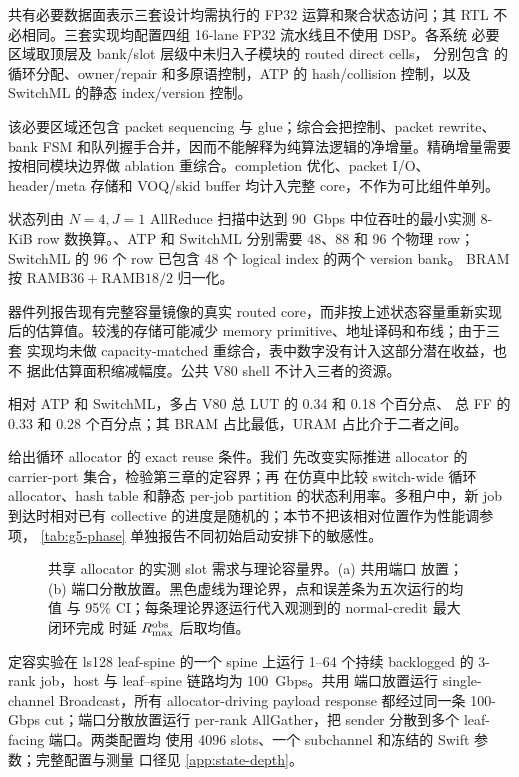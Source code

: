 共有必要数据面表示三套设计均需执行的 FP32 运算和聚合状态访问；其 RTL
不必相同。三套实现均配置四组 16-lane FP32 流水线且不使用 DSP。各系统
必要区域取顶层及 bank/slot 层级中未归入子模块的 routed direct cells，
分别包含 \sysname 的循环分配、owner/repair 和多原语控制，ATP 的
hash/collision 控制，以及 SwitchML 的静态 index/version 控制。

该必要区域还包含 packet sequencing 与 glue；综合会把控制、packet rewrite、
bank FSM 和队列握手合并，因而不能解释为纯算法逻辑的净增量。精确增量需要
按相同模块边界做 ablation 重综合。completion 优化、packet I/O、
header/meta 存储和 VOQ/skid buffer 均计入完整 core，不作为可比组件单列。

状态列由 $N=4,J=1$ AllReduce 扫描中达到 90~Gbps 中位吞吐的最小实测
8-KiB row 数换算。\sysname、ATP 和 SwitchML 分别需要 48、88 和 96 个物理
row；SwitchML 的 96 个 row 已包含 48 个 logical index 的两个 version bank。
BRAM 按 $\mathrm{RAMB36}+\mathrm{RAMB18}/2$ 归一化。

器件列报告现有完整容量镜像的真实 routed core，而非按上述状态容量重新实现
后的估算值。较浅的存储可能减少 memory primitive、地址译码和布线；由于三套
实现均未做 capacity-matched 重综合，表中数字没有计入这部分潜在收益，也不
据此估算面积缩减幅度。公共 V80 shell 不计入三者的资源。

相对 ATP 和 SwitchML，\sysname 多占 V80 总 LUT 的 0.34 和 0.18 个百分点、
总 FF 的 0.33 和 0.28 个百分点；其 BRAM 占比最低，URAM 占比介于二者之间。

 给出循环 allocator 的 exact reuse 条件。我们
先改变实际推进 allocator 的 carrier-port 集合，检验第三章的定容界；再
在仿真中比较 switch-wide 循环 allocator、hash table 和静态
per-job partition 的状态利用率。多租户中，新 job 到达时相对已有
collective 的进度是随机的；本节不把该相对位置作为性能调参项，
\cref{tab:g5-phase} 单独报告不同初始启动安排下的敏感性。

\begin{figure}[t]
\centering

\caption{共享 allocator 的实测 slot 需求与理论容量界。(a) 共用端口
放置；(b) 端口分散放置。黑色虚线为理论界，点和误差条为五次运行的均值
与 95\% CI；每条理论界逐运行代入观测到的 normal-credit 最大闭环完成
时延 $R_{\max}^{\rm obs}$ 后取均值。}
\label{fig:state-bound}
\end{figure}

定容实验在 ls128 leaf-spine 的一个 spine 上运行 1--64 个持续
backlogged 的 3-rank job，host 与 leaf--spine 链路均为 100~Gbps。共用
端口放置运行 single-channel Broadcast，所有 allocator-driving
payload response 都经过同一条 100-Gbps cut；端口分散放置运行
per-rank AllGather，把 sender 分散到多个 leaf-facing 端口。两类配置均
使用 4096 slots、一个 subchannel 和冻结的 Swift 参数；完整配置与测量
口径见 \cref{app:state-depth}。

